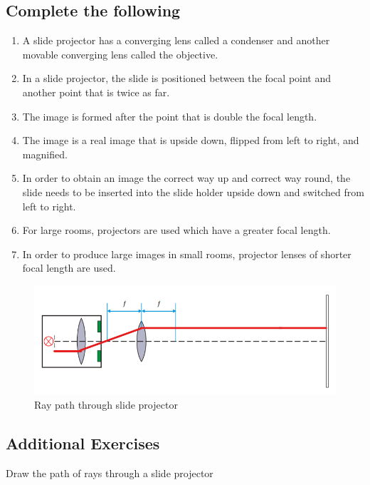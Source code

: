 \documentclass[12pt]{article}
\begin{document}
\subsection*{Complete the following}
\begin{enumerate}
    \item A slide projector has a converging lens called a condenser and another movable converging lens called the objective. 
    \item In a slide projector, the slide is positioned between the focal point and another point that is twice as far.
    \item The image is formed after the point that is double the focal length.
    \item The image is a real image that is upside down, flipped from left to right, and magnified. 
    \item In order to obtain an image the correct way up and correct way round, the slide needs to be inserted into the slide holder upside down and switched from left to right. 
    \item For large rooms, projectors are used which have a greater focal length.
    \item In order to produce large images in small rooms, projector lenses of shorter focal length are used. 
\end{enumerate}

\begin{figure}[h]
\begin{center}
\includegraphics[scale=0.8]{602_diagram.PNG}
\caption{Ray path through slide projector}
\end{center}
\end{figure}

\subsection*{Additional Exercises}
Draw the path of rays through a slide projector

\newpage
\end{document}
